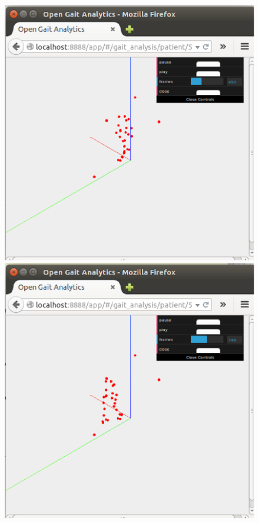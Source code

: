 \begin{figure}[ht]
  \centering
  \begin{minipage}[b]{0.32\textwidth}
    \includegraphics[width=\textwidth]{figuras/tela8.eps}
  \end{minipage}
  \hfill
  \begin{minipage}[b]{0.32\textwidth}
    \includegraphics[width=\textwidth]{figuras/tela9.eps}

\end{minipage}
\end{figure}
